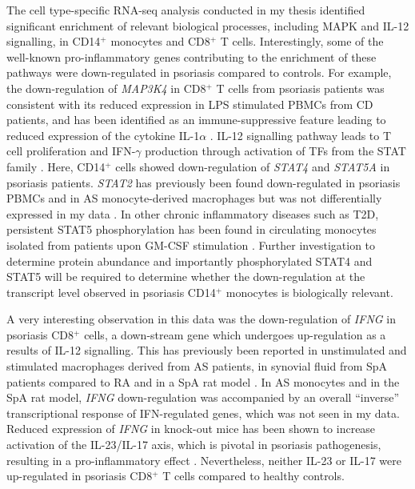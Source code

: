 The cell type-specific RNA-seq analysis conducted in my thesis identified significant enrichment of relevant biological processes, including MAPK and IL-12 signalling, in CD14$^+$ monocytes and CD8$^+$ T cells. Interestingly, some of the well-known pro-inflammatory genes contributing to the enrichment of these pathways were down-regulated in psoriasis compared to controls. For example, the down-regulation of \textit{MAP3K4} in CD8$^+$ T cells from psoriasis patients was consistent with its reduced expression in LPS stimulated PBMCs from CD patients, and has been identified as an immune-suppressive feature leading to reduced expression of the cytokine IL-1$\alpha$  \parencite{Kraan2012}. IL-12 signalling pathway leads to T cell proliferation and IFN-$\gamma$ production through activation of TFs from the STAT family \parencite{Kusaba2005}. Here, CD14$^+$ cells showed down-regulation of \textit{STAT4} and \textit{STAT5A} in psoriasis patients. \textit{STAT2} has previously been found down-regulated in psoriasis PBMCs and in AS monocyte-derived macrophages but was not differentially expressed in my data \parencite{Coda2012,Smith2008}. In other chronic inflammatory diseases such as T2D, persistent STAT5 phosphorylation has been found in circulating monocytes isolated from patients upon GM-CSF stimulation \parencite{Litherland2005}. Further investigation to determine protein abundance and importantly phosphorylated STAT4 and STAT5 will be required to determine whether the down-regulation at the transcript level observed in psoriasis CD14$^+$ monocytes is biologically relevant. 

A very interesting observation in this data was the down-regulation of \textit{IFNG} in psoriasis CD8$^+$ cells, a  down-stream gene which undergoes up-regulation as a results of IL-12 signalling. This has previously been reported in unstimulated and stimulated macrophages derived from AS patients, in synovial fluid from SpA patients compared to RA and in a SpA rat model \parencite{Smith2008,Fert2014, }. In AS monocytes and in the SpA rat model, \textit{IFNG} down-regulation was accompanied by an overall “inverse” transcriptional response of IFN-regulated genes, which was not seen in my data. Reduced expression of \textit{IFNG} in knock-out mice has been shown to increase activation of the IL-23/IL-17 axis, which is pivotal in psoriasis pathogenesis, resulting in a pro-inflammatory effect  \parencite{Canete2000,Chu2007}. Nevertheless, neither IL-23 or IL-17 were up-regulated in psoriasis CD8$^+$ T cells compared to healthy controls.

